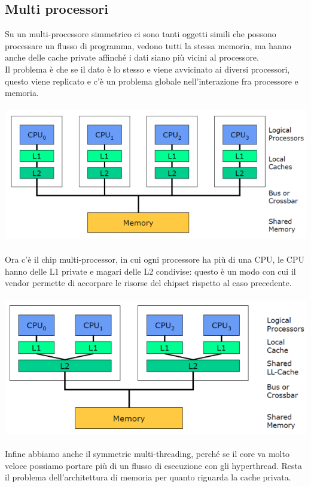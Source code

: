 \documentclass[12pt, oneside]{extbook}
\begin{document}
\subsection{Multi processori}
Su un multi-processore simmetrico ci sono tanti oggetti simili che possono processare un flusso di programma, vedono tutti la stessa memoria, ma hanno anche delle cache private affinché i dati siano più vicini al processore.\\ Il problema è che se il dato è lo stesso e viene avvicinato ai diversi processori, questo viene replicato e c'è un problema globale nell'interazione fra processore e memoria.\\\\
\includegraphics[scale=0.5]{immagini/multi_proc}\\\\
Ora c'è il chip multi-processor, in cui ogni processore ha più di una CPU, le CPU hanno delle L1 private e magari delle L2 condivise: questo è un modo con cui il vendor permette di accorpare le risorse del chipset rispetto al caso precedente.\\\\
\includegraphics[scale=0.5]{immagini/cmp.png} \\\\
Infine abbiamo anche il symmetric multi-threading, perché se il core va molto veloce possiamo portare più di un flusso di esecuzione con gli hyperthread. Resta il problema dell'architettura di memoria per quanto riguarda la cache privata.\\\\ 
\end{document}
